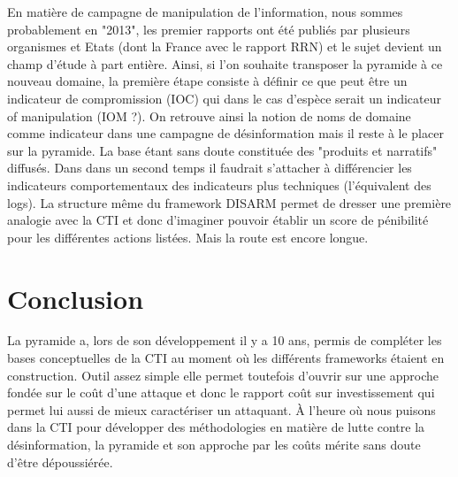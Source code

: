\documentclass[a4paper]{article}
\begin{document}
En matière de campagne de manipulation de l’information, nous sommes probablement en "2013", les premier rapports ont été publiés par plusieurs organismes et Etats (dont la France avec le rapport RRN) et le sujet devient un champ d'étude à part entière. Ainsi, si l'on souhaite transposer la pyramide à ce nouveau domaine, la première étape consiste à définir ce que peut être un indicateur de compromission (IOC) qui dans le cas d’espèce serait un indicateur of manipulation (IOM ?). On retrouve ainsi la notion de noms de domaine comme indicateur dans une campagne de désinformation mais il reste à le placer sur la pyramide. La base étant sans doute constituée des "produits et narratifs" diffusés. Dans dans un second temps il faudrait s’attacher à différencier les indicateurs comportementaux des indicateurs plus techniques (l’équivalent des logs). La structure même du framework DISARM permet de dresser une première analogie avec la CTI et donc d’imaginer pouvoir établir un score de pénibilité pour les différentes actions listées. Mais la route est encore longue.

\section{Conclusion}
La pyramide a, lors de son développement il y a 10 ans, permis de compléter les bases conceptuelles de la CTI au moment où les différents frameworks étaient en construction. Outil assez simple elle permet toutefois d’ouvrir sur une approche fondée sur le coût d’une attaque et donc le rapport coût sur investissement qui permet lui aussi de mieux caractériser un attaquant. À l’heure où nous puisons dans la CTI pour développer des méthodologies en matière de lutte contre la désinformation, la pyramide et son approche par les coûts mérite sans doute d’être dépoussiérée.
\end{document}

